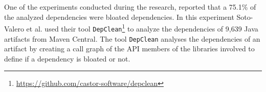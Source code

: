 One of the experiments conducted during the research, reported that a 75.1\% of the analyzed dependencies were bloated dependencies. In this experiment Soto-Valero et al. used their tool \texttt{DepClean}\footnote{\href{https://github.com/castor-software/depclean}{https://github.com/castor-software/depclean}} to analyze the dependencies of 9,639 Java artifacts from Maven Central.
The tool \texttt{DepClean} analyses the dependencies of an artifact by creating a call graph of the API members of the libraries involved to define if a dependency is bloated or not.




